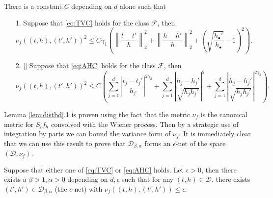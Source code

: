 \begin{lemma}
\label{lem:distbd}
There is a constant $C$ depending on $d$ alone such that
\begin{enumerate}
    \item[1.] Suppose that \eqref{eq:TVC} holds for the class $\mathcal F$, then
    $$
    \nu_f((t,h),(t',h'))^2 \le C \gamma_1 \left( \left\| \frac{t - t'}{h} \right\|^2_2 + \left\| \frac{h - h'}{h} \right\|^2_2 + \left( \sqrt{\frac{h_\bullet'}{h_\bullet}} - 1 \right)^2\right).
    $$
    \item[2.] [\cite{proksch2016multiscale}] Suppose that \eqref{eq:AHC} holds for the class $\mathcal F$, then
    $$
    \nu_f((t,h),(t',h'))^2 \le C \left( \sum_{j=1}^d \left| \frac{t_j-t_j'}{h_j} \right|^{2 \gamma_2} + \sum_{j=1}^d \left| \frac{h_j - h_j'}{\sqrt{h_j h_j'}} \right|^2 + \sum_{j=1}^d \left| \frac{h_j - h_j'}{\sqrt{h_j h_j'}} \right|^{2\gamma_2} \right).
    $$
\end{enumerate}
\end{lemma}

Lemma \ref{lem:distbd}.1 is proven using the fact that the metric $\nu_f$ is the canonical metric for $S_t f_h$ convolved with the Wiener process.
Then by a strategic use of integration by parts we can bound the variance form of $\nu_f$.
It is immediately clear that we can use this result to prove that $\mathcal D_{\beta,\alpha}$ forms an $\epsilon$-net of the space $(\mathcal D, \nu_f)$.


\begin{theorem}
\label{thm:epsnet}
Suppose that either one of \eqref{eq:TVC} or \eqref{eq:AHC} holds.
Let $\epsilon > 0$, then there exists a $\beta > 1, \alpha > 0$ depending on $d,\epsilon$ such that for any $(t,h) \in \mathcal D$, there exists $(t',h') \in \mathcal D_{\beta,\alpha}$ (the $\epsilon$-net) with $\nu_f ((t,h),(t',h')) \le \epsilon.$
\end{theorem}

